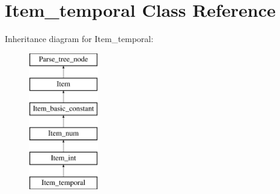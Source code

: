 \hypertarget{classItem__temporal}{}\section{Item\+\_\+temporal Class Reference}
\label{classItem__temporal}
Inheritance diagram for Item\+\_\+temporal\+:\begin{figure}[H]
\begin{center}
\leavevmode
\includegraphics[height=6.000000cm]{classItem__temporal}
\end{center}
\end{figure}
